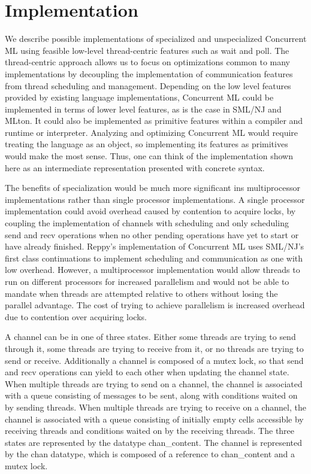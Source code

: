 \documentclass{article}
\begin{document}
\section{Implementation}
We describe possible implementations of specialized and unspecialized Concurrent ML using
feasible low-level thread-centric features such as wait and poll.  The thread-centric approach
allows us to focus on optimizations common to many implementations by decoupling the
implementation of communication features from thread scheduling and management.  Depending on
the low level features provided by existing language implementations, Concurrent ML could be
implemented in terms of lower level features, as is the case in SML/NJ and MLton.  It could
also be implemented as primitive features within a compiler and runtime or interpreter.
Analyzing and optimizing Concurrent ML would require treating the language as an object, so
implementing its features as primitives would make the most sense.  Thus, one can think of the
implementation shown here as an intermediate representation presented with concrete syntax.

The benefits of specialization would be much more significant ins multiprocessor
implementations rather than single processor implementations.  A single processor
implementation could avoid overhead caused by contention to acquire locks, by coupling the
implementation of channels with scheduling and only scheduling send and recv operations when no
other pending operations have yet to start or have already finished.  Reppy's implementation of
Concurrent ML uses SML/NJ's first class continuations to implement scheduling and communication
as one with low overhead.  However, a multiprocessor implementation would allow threads to run
on different processors for increased parallelism and would not be able to mandate when threads
are attempted relative to others without losing the parallel advantage.  The cost of trying to
achieve parallelism is increased overhead due to contention over acquiring locks.

A channel can be in one of three states.  Either some threads are trying to send through it,
some threads are trying to receive from it, or no threads are trying to send or receive.
Additionally a channel is composed of a mutex lock, so that send and recv operations can yield
to each other when updating the channel state.  When multiple threads are trying to send on a
channel, the channel is associated with a queue consisting of messages to be sent, along with
conditions waited on by sending threads. When multiple threads are trying to receive on a
channel, the channel is associated with a queue consisting of initially empty cells accessible
by receiving threads and conditions waited on by the receiving threads. The three states are
represented by the datatype chan\_content.  The channel is represented by the chan datatype,
which is composed of a reference to chan\_content and a mutex lock.  
\end{document}
